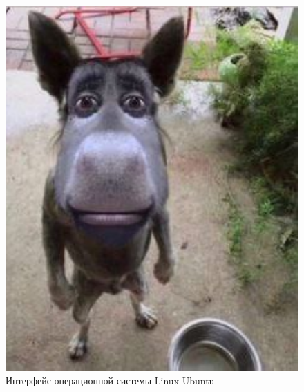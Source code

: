 \begin{figure}[H]
  \centering
  \includegraphics[width=1\textwidth]{resources/5.jpg}
  \caption{Интерфейс операционной системы Linux Ubuntu}
  \label{Linux}
\end{figure}

